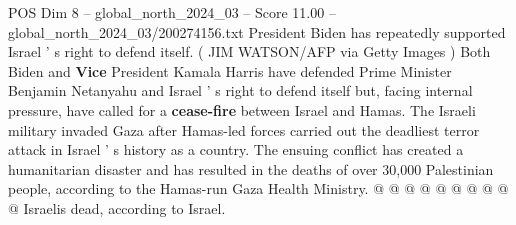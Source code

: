 \begin{textsample}{POS Dim 8 – global\_north\_2024\_03 – Score 11.00 – global\_north\_2024\_03/200274156.txt}
President Biden has repeatedly supported Israel ' s right to defend itself. ( JIM WATSON/AFP via Getty Images ) Both Biden and \textbf{Vice} President Kamala Harris have defended Prime Minister Benjamin Netanyahu and Israel ' s right to defend itself but, facing internal pressure, have called for a \textbf{cease-fire} between Israel and Hamas.
The Israeli military invaded Gaza after Hamas-led forces carried out the deadliest terror attack in Israel ' s history as a country.
The ensuing conflict has created a humanitarian disaster and has resulted in the deaths of over 30,000 Palestinian people, according to the Hamas-run Gaza Health Ministry. @ @ @ @ @ @ @ @ @ @ Israelis dead, according to Israel.

\end{textsample}

